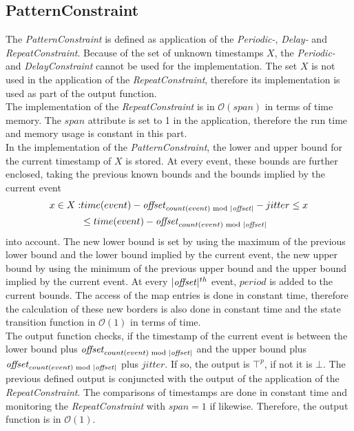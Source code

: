 \subsection{PatternConstraint}
	The \emph{PatternConstraint} is defined as application of the \emph{Periodic-}, \emph{Delay-} and \emph{RepeatConstraint}. Because of the set of unknown timestamps $X$, the \emph{Periodic-} and \emph{DelayConstraint} cannot be used for the implementation. The set $X$ is not used in the application of the \emph{RepeatConstraint}, therefore its implementation is used as part of the output function.\\
	The implementation of the \emph{RepeatConstraint} is in $\mathcal{O}(span)$ in terms of time memory. The $span$ attribute is set to 1 in the application, therefore the run time and memory usage is constant in this part.\\
	In the implementation of the \emph{PatternConstraint}, the lower and upper bound for the current timestamp of $X$ is stored. At every event, these bounds are further enclosed, taking the previous known bounds and the bounds implied by the current event
	\begin{align}
		x\in X: &time(event)-\text{\emph{offset}}_{count(event)\text{ mod }|\text{\emph{offset}}|}-jitter \leq x\\
			     &\leq  time(event)-\text{\emph{offset}}_{count(event)\text{ mod }|\text{\emph{offset}}|}
	\end{align}
	into account. The new lower bound is set by using the maximum of the previous lower bound and the lower bound implied by the current event, the new upper bound by using the minimum of the previous upper bound and the upper bound implied by the current event. At every $|\text{\emph{offset}}|^{th}$ event, $period$ is added to the current bounds. The access of the map entries is done in constant time, therefore the calculation of these new borders is also done in constant time and the state transition function in $\mathcal{O}(1)$ in terms of time.\\
	The output function checks, if the timestamp of the current event is between the lower bound plus $\text{\emph{offset}}_{count(event)\text{ mod }|\text{\emph{offset}}|}$ and the upper bound plus \\$\text{\emph{offset}}_{count(event)\text{ mod }|\text{\emph{offset}}|}$ plus $jitter$. If so, the output is $\top^p$, if not it is $\bot$. The previous defined output is conjuncted with the output of the application of the \textit{RepeatConstraint}. The comparisons of timestamps are done in constant time and monitoring the \textit{RepeatConstraint} with $span=1$ if likewise. Therefore, the output function is in $\mathcal{O}(1)$.\\
